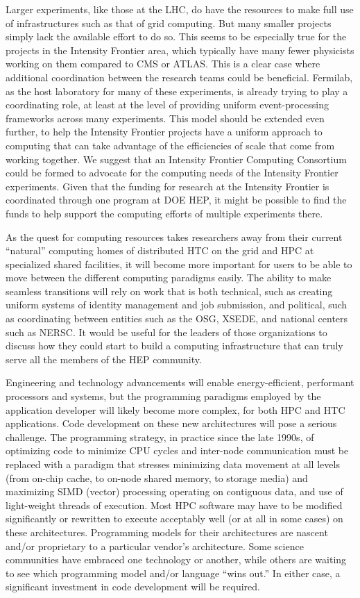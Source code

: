 Larger experiments, like those at the LHC, do have the resources to make full use of infrastructures such as that of grid computing.  But many smaller projects simply lack the available effort to do so.  This seems to be especially true for the projects in the Intensity Frontier area, which typically have many fewer physicists working on them compared to CMS or ATLAS.  This is a clear case where additional coordination between the research teams could be beneficial.  Fermilab, as the host laboratory for many of these experiments, is already trying to play a coordinating role, at least at the level of providing uniform event-processing frameworks across many experiments.  This model should be extended even further, to help the Intensity Frontier projects have a uniform approach to computing that can take advantage of the efficiencies of scale that come from working together.  We suggest that an Intensity Frontier Computing Consortium could be formed to advocate for the computing needs of the Intensity Frontier experiments.  Given that the funding for research at the Intensity Frontier is coordinated through one program at DOE HEP, it might be possible to find the funds to help support the computing efforts of multiple experiments there.

As the quest for computing resources takes researchers away from their current “natural” computing homes of distributed HTC on the grid and HPC at specialized shared facilities, it will become more important for users to be able to move between the different computing paradigms easily.  The ability to make seamless transitions will rely on work that is both technical, such as creating uniform systems of identity management and job submission, and political, such as coordinating between entities such as the OSG, XSEDE, and national centers such as NERSC.  It would be useful for the leaders of those organizations to discuss how they could start to build a computing infrastructure that can truly serve all the members of the HEP community.


Engineering and technology advancements will enable energy-efficient, performant processors and systems, but the 
programming paradigms employed by the application developer will likely become more complex, for both HPC and HTC 
applications.   
Code development on these new architectures will pose a serious challenge. 
The programming strategy, in practice since the late 1990s, of optimizing code to minimize CPU cycles and 
inter-node communication must be replaced with a paradigm that stresses minimizing data movement at all levels 
(from on-chip cache, to on-node shared memory, to storage media) and maximizing SIMD (vector) 
processing operating on contiguous data, and use of light-weight threads of execution. 
Most HPC software may have to be modified significantly or rewritten to execute acceptably well 
(or at all in some cases) on these architectures. Programming models for their architectures are 
nascent and/or proprietary to a particular vendor’s architecture. Some science communities have 
embraced one technology or another, while others are waiting to see which programming model 
and/or language “wins out.” In either case, a significant investment in code development will be required.
 
